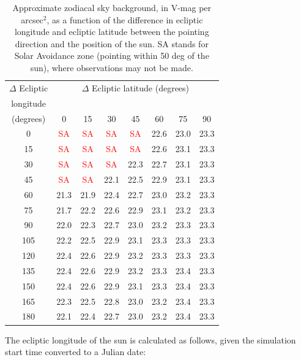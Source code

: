 \documentclass[11pt]{article}      %
\begin{document}
\begin{table}[hb]
  \begin{center}
  \caption{Approximate zodiacal sky background, in V-mag per arcsec$^2$, as a function of the difference in ecliptic longitude and ecliptic latitude between the pointing direction and the position of the sun. SA stands for Solar Avoidance zone (pointing within 50 deg of the sun), where observations may not be made.}
  \begin{tabular}{|c|ccccccc|}
\hline
$\Delta$ Ecliptic & \multicolumn{7}{|c|}{$\Delta$ Ecliptic latitude (degrees)} \\
longitude & & & & & & & \\
(degrees) & 0 & 15 & 30 & 45 & 60 & 75 & 90 \\
\hline
0 & \textcolor{red}{SA} & \textcolor{red}{SA} & \textcolor{red}{SA} & \textcolor{red}{SA} & 22.6 & 23.0 & 23.3 \\
15 & \textcolor{red}{SA} & \textcolor{red}{SA} & \textcolor{red}{SA} & \textcolor{red}{SA} & 22.6 & 23.1 & 23.3 \\
30 & \textcolor{red}{SA} & \textcolor{red}{SA} & \textcolor{red}{SA} & 22.3 & 22.7 & 23.1 & 23.3 \\
45 & \textcolor{red}{SA} & \textcolor{red}{SA} & 22.1 & 22.5 & 22.9 & 23.1 & 23.3 \\
60 & 21.3 & 21.9 & 22.4 & 22.7 & 23.0 & 23.2 & 23.3 \\
75 & 21.7 & 22.2 & 22.6 & 22.9 & 23.1 & 23.2 & 23.3 \\
90 & 22.0 & 22.3 & 22.7 & 23.0 & 23.2 & 23.3 & 23.3 \\
105 & 22.2 & 22.5 & 22.9 & 23.1 & 23.3 & 23.3 & 23.3 \\
120 & 22.4 & 22.6 & 22.9 & 23.2 & 23.3 & 23.3 & 23.3 \\
135 & 22.4 & 22.6 & 22.9 & 23.2 & 23.3 & 23.4 & 23.3 \\
150 & 22.4 & 22.6 & 22.9 & 23.1 & 23.3 & 23.4 & 23.3 \\
165 & 22.3 & 22.5 & 22.8 & 23.0 & 23.2 & 23.4 & 23.3 \\
180 & 22.1 & 22.4 & 22.7 & 23.0 & 23.2 & 23.4 & 23.3 \\
\hline
  \end{tabular}
  \label{tab:zodiacal_vs_direction}
\end{center}
\end{table}

The ecliptic longitude of the sun is calculated as follows, given the simulation start time converted to a Julian date:
\end{document}

